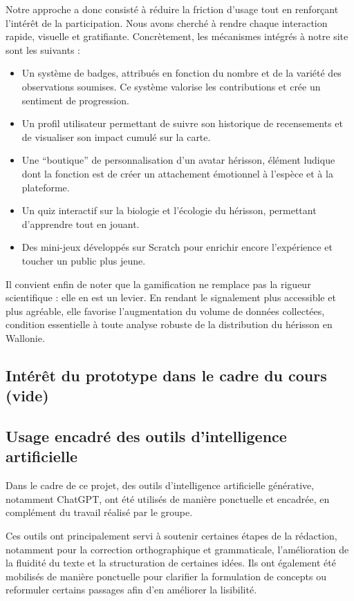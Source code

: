 \documentclass[a4paper,11pt]{article}
\begin{document}
Notre approche a donc consisté à réduire la friction d’usage tout en renforçant l’intérêt de la participation. Nous avons cherché à rendre chaque interaction rapide, visuelle et gratifiante. Concrètement, les mécanismes intégrés à notre site sont les suivants :
\begin{itemize}
    \item Un système de badges, attribués en fonction du nombre et de la variété des observations soumises. Ce système  valorise les contributions et crée un sentiment de progression.
    \item Un profil utilisateur permettant de suivre son historique de recensements et de visualiser son impact cumulé sur la carte.
    \item Une \enquote{boutique} de personnalisation d'un avatar hérisson, élément ludique dont la fonction est de créer un attachement émotionnel à l'espèce et à la plateforme.
    \item Un quiz interactif sur la biologie et l'écologie du hérisson, permettant d'apprendre tout en jouant.
    \item Des mini-jeux développés sur Scratch pour enrichir encore l'expérience et toucher un public plus jeune.
\end{itemize}

Il convient enfin de noter que la gamification ne remplace pas la rigueur scientifique : elle en est un levier. En rendant le signalement plus accessible et plus agréable, elle favorise l’augmentation du volume de données collectées, condition essentielle à toute analyse robuste de la distribution du hérisson en Wallonie.

\subsection{Intérêt du prototype dans le cadre du cours (vide)}

\subsection{Usage encadré des outils d’intelligence artificielle}

Dans le cadre de ce projet, des outils d’intelligence artificielle générative, notamment ChatGPT, ont été utilisés de manière ponctuelle et encadrée, en complément du travail réalisé par le groupe.

Ces outils ont principalement servi à soutenir certaines étapes de la rédaction, notamment pour la correction orthographique et grammaticale, l’amélioration de la fluidité du texte et la structuration de certaines idées. Ils ont également été mobilisés de manière ponctuelle pour clarifier la formulation de concepts ou reformuler certains passages afin d’en améliorer la lisibilité.
\end{document}
